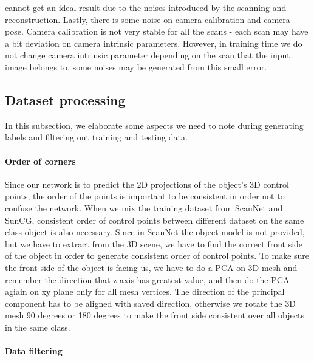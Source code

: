 cannot get an ideal result due to the noises introduced by the scanning and reconstruction. Lastly, there is some noise on camera calibration and camera pose. Camera calibration is not very stable for all the scans - each scan may have a bit deviation on camera intrinsic parameters. However, in training time we do not change camera intrinsic parameter depending on the scan that the input image belongs to, some noises may be generated from this small error.
 
\subsection{Dataset processing}

In this subsection, we elaborate some aspects we need to note during generating labels and filtering out training and testing data.

\paragraph{Order of corners}

Since our network is to predict the 2D projections of the object's 3D control points, the order of the points is important to be consistent in order not to confuse the network. When we mix the training dataset from ScanNet and SunCG, consistent order of control points between different dataset on the same class object is also necessary. Since in ScanNet the object model is not provided, but we have to extract from the 3D scene, we have to find the correct front side of the object in order to generate consistent order of control points. To make sure the front side of the object is facing us, we have to do a PCA on 3D mesh and remember the direction that z axis has greatest value, and then do the PCA agiain on xy plane only for all mesh vertices. The direction of the principal component has to be aligned with saved direction, otherwise we rotate the 3D mesh 90 degrees or 180 degrees to make the front side consistent over all objects in the same class.


\paragraph{Data filtering}


